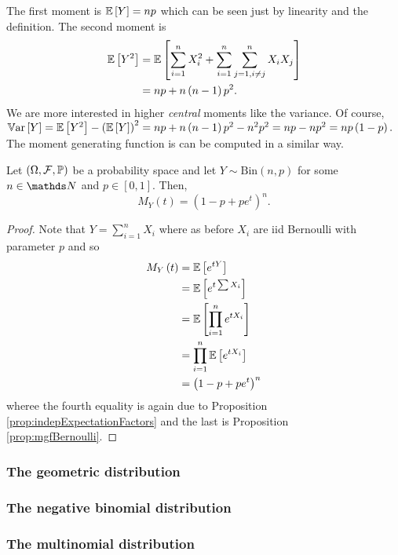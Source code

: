 The first moment is $\mathbb{E}\left[Y\right]=np$ which can be seen just
by linearity and the definition. The second moment is
\begin{align*}
\mathbb{E}\left[Y^{2}\right] & =\mathbb{E}\left[\sum_{i=1}^{n}X_{i}^{2}+\sum_{i=1}^{n}\sum_{j=1,i\neq j}^{n}X_{i}X_{j}\right]\\
 & =np+n\left(n-1\right)p^{2}.
\end{align*}
We are more interested in higher \emph{central }moments like the variance.
Of course, $\mathbb{V\mathrm{ar}}\left[Y\right]=\mathbb{E}\left[Y^{2}\right]-\left(\mathbb{E}\left[Y\right]\right)^{2}=np+n\left(n-1\right)p^{2}-n^{2}p^{2}=np-np^{2}=np\left(1-p\right).$
The moment generating function is can be computed in a similar way.
\begin{prop}
\label{prop:mgfBinomial}Let $\left(\Omega,\mathcal{F},\mathbb{\mathbb{\mathbb{P}}}\right)$ be a probability
space and let $Y\sim\mathrm{Bin}\left(n,p\right)$ for some $n\in\N$
and $p\in\left[0,1\right]$. Then,
\[
M_{Y}\left(t\right)=\left(1-p+pe^{t}\right)^{n}.
\]
\end{prop}

\begin{proof}
Note that $Y=\sum_{i=1}^{n}X_{i}$ where as before $X_{i}$ are iid
Bernoulli with parameter $p$ and so
\begin{align*}
M_{Y}\left(t\right) & =\mathbb{E}\left[e^{tY}\right]\\
 & =\mathbb{E}\left[e^{t\sum X_{i}}\right]\\
 & =\mathbb{E}\left[\prod_{i=1}^{n}e^{tX_{i}}\right]\\
 & =\prod_{i=1}^{n}\mathbb{E}\left[e^{tX_{i}}\right]\\
 & =\left(1-p+pe^{t}\right)^{n}
\end{align*}
wheree the fourth equality is again due to Proposition \ref{prop:indepExpectationFactors}
and the last is Proposition \ref{prop:mgfBernoulli}.
\end{proof}

\subsubsection{The geometric distribution}

\subsubsection{The negative binomial distribution}

\subsubsection{The multinomial distribution}

